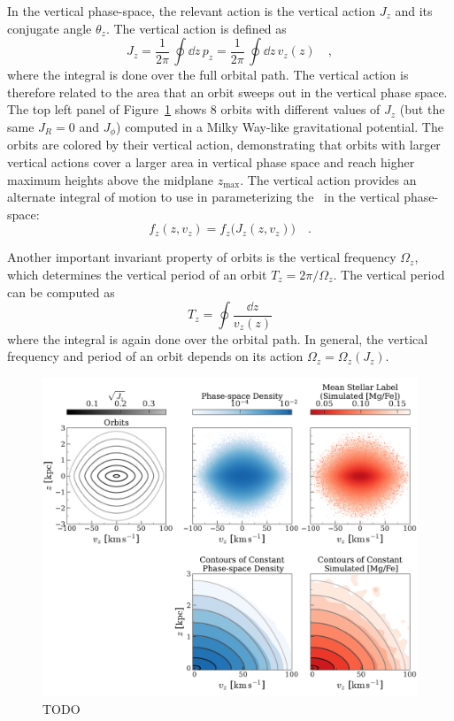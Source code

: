 In the vertical phase-space, the relevant action is the vertical action $J_z$ and its
conjugate angle $\theta_z$.
The vertical action is defined as
\begin{equation}
    J_z = \frac{1}{2\pi} \, \oint \dd z \, p_z =
        \frac{1}{2\pi} \, \oint \dd z \, v_z(z) \quad,
\end{equation}
where the integral is done over the full orbital path.
The vertical action is therefore related to the area that an orbit sweeps out in the
vertical phase space.
The top left panel of Figure~\ref{fig:sim-contours} shows 8 orbits with different values
of $J_z$ (but the same $J_R=0$ and $J_\phi$) computed in a Milky Way-like gravitational
potential.
The orbits are colored by their vertical action, demonstrating that orbits with larger
vertical actions cover a larger area in vertical phase space and reach higher maximum
heights above the midplane $z_{\textrm{max}}$.
The vertical action provides an alternate integral of motion to use in parameterizing
the \df\ in the vertical phase-space:
\begin{equation}
    f_z(z, v_z) = f_z\Big(J_z(z, v_z)\Big) \quad .
\end{equation}

Another important invariant property of orbits is the vertical frequency $\Omega_z$,
which determines the vertical period of an orbit $T_z = 2\pi / \Omega_z$.
The vertical period can be computed as
\begin{equation}
    T_z = \oint \frac{\dd z}{v_z(z)}
\end{equation}
where the integral is again done over the orbital path.
In general, the vertical frequency and period of an orbit depends on its action
$\Omega_z = \Omega_z(J_z)$.


\begin{figure}[t!]
\begin{center}
\includegraphics[width=\textwidth]{simulated-orbits-contours.pdf}
\end{center}
\caption{%
TODO
\label{fig:sim-contours}
}
\end{figure}


